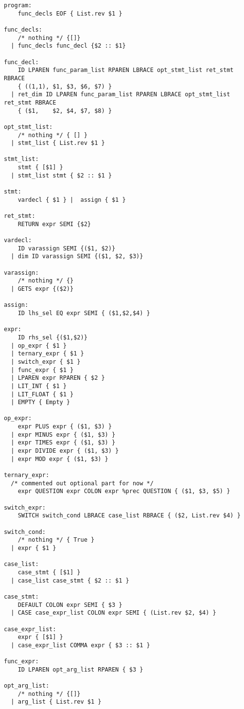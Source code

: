 \begin{verbatim}
program:
    func_decls EOF { List.rev $1 }

func_decls:
    /* nothing */ {[]}
  | func_decls func_decl {$2 :: $1}

func_decl:
    ID LPAREN func_param_list RPAREN LBRACE opt_stmt_list ret_stmt RBRACE
    { ((1,1), $1, $3, $6, $7) }
  | ret_dim ID LPAREN func_param_list RPAREN LBRACE opt_stmt_list ret_stmt RBRACE
    { ($1,    $2, $4, $7, $8) }

opt_stmt_list:
    /* nothing */ { [] }
  | stmt_list { List.rev $1 }

stmt_list:
    stmt { [$1] }
  | stmt_list stmt { $2 :: $1 }

stmt:
    vardecl { $1 } |  assign { $1 }

ret_stmt:
    RETURN expr SEMI {$2}

vardecl:
    ID varassign SEMI {($1, $2)}
  | dim ID varassign SEMI {($1, $2, $3)}

varassign:
    /* nothing */ {}
  | GETS expr {($2)}

assign:
    ID lhs_sel EQ expr SEMI { ($1,$2,$4) }

expr:
    ID rhs_sel {($1,$2)}
  | op_expr { $1 }
  | ternary_expr { $1 }
  | switch_expr { $1 }
  | func_expr { $1 }
  | LPAREN expr RPAREN { $2 }
  | LIT_INT { $1 }
  | LIT_FLOAT { $1 }
  | EMPTY { Empty }

op_expr:
    expr PLUS expr { ($1, $3) }
  | expr MINUS expr { ($1, $3) }
  | expr TIMES expr { ($1, $3) }
  | expr DIVIDE expr { ($1, $3) }
  | expr MOD expr { ($1, $3) }

ternary_expr:
  /* commented out optional part for now */
    expr QUESTION expr COLON expr %prec QUESTION { ($1, $3, $5) }

switch_expr:
    SWITCH switch_cond LBRACE case_list RBRACE { ($2, List.rev $4) }

switch_cond:
    /* nothing */ { True }
  | expr { $1 }

case_list:
    case_stmt { [$1] }
  | case_list case_stmt { $2 :: $1 }

case_stmt:
    DEFAULT COLON expr SEMI { $3 }
  | CASE case_expr_list COLON expr SEMI { (List.rev $2, $4) }

case_expr_list:
    expr { [$1] }
  | case_expr_list COMMA expr { $3 :: $1 }

func_expr:
    ID LPAREN opt_arg_list RPAREN { $3 }

opt_arg_list:
    /* nothing */ {[]}
  | arg_list { List.rev $1 }


\end{verbatim}

